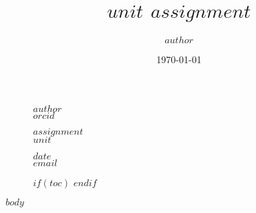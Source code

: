 \documentclass[10pt, a4paper, fleqn]{article}
\title{$unit$ $assignment$}
\author{$author$}
\date{\today}
\begin{document}
	\thispagestyle{plain}
	\begin{figure}[!t]
		\begin{minipage}{0.295\textwidth} %
			\raggedright
			$author$ %
			\\
			\footnotesize
			$orcid$ %
		\end{minipage}
		\begin{minipage}{0.4\textwidth} %
			\centering
			\Huge %
			$assignment$ %
			\\
			\Large %
			$unit$ %
		\end{minipage}
		\begin{minipage}{0.295\textwidth} %
			\raggedleft
			$date$ %
			\\
			\footnotesize %
			\href{mailto:$email$}{$email$}%
		\end{minipage}
		$if(toc)$
			\fbox{\begin{minipage}{\textwidth}
				{
					\setcounter{tocdepth}{$toc-depth$}
					\tableofcontents
				}
				\iftotalfigures
					\listoffigures
				\fi
				\iftotaltables
					\listoftables
				\fi
			\end{minipage}}
		$endif$
	\end{figure}
	$body$
\end{document}
